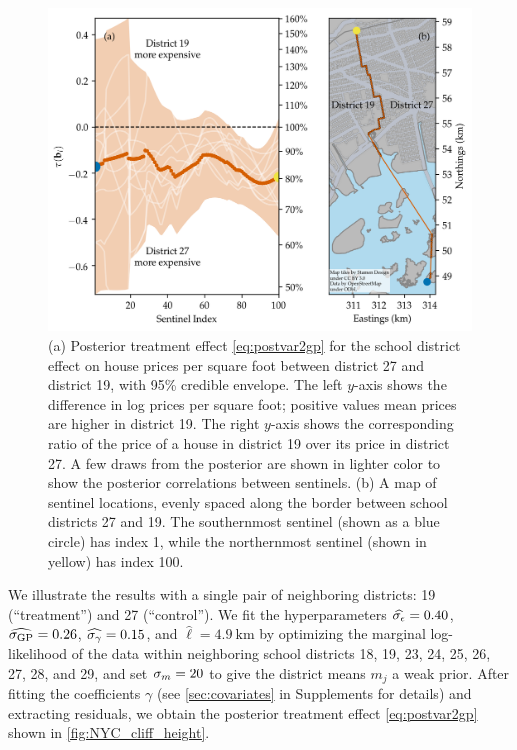 \documentclass{article}
\newcommand{\autorefexternal}[1]{\autoref*{#1}}
\begin{document}
\begin{figure}
  \begin{minipage}[c]{0.5\textwidth}
    \includegraphics[width=\textwidth]{figures/NYC_cliff_face.png}
  \end{minipage}\hfill
  \begin{minipage}[c]{0.5\textwidth}
    \caption{
        (a)
        Posterior treatment effect \autoref{eq:postvar2gp} for the school district effect on house prices per square foot between district 27 and district 19, with 95\% credible envelope.
        The left \(y\)-axis shows the difference in log prices per square foot; positive values mean prices are higher in district 19.
        The right \(y\)-axis shows the corresponding ratio of the price of a house in district 19 over its price in district 27.
        A few draws from the posterior are shown in lighter color to show the posterior correlations between sentinels.
        (b)
        A map of sentinel locations, evenly spaced along the border between school districts 27 and 19.
    	The southernmost sentinel (shown as a blue circle) has index 1, while the northernmost sentinel (shown in yellow) has index 100.\label{fig:NYC_cliff_height}
    } 
  \end{minipage}
\end{figure}

We illustrate the results with a single pair of neighboring districts: 19 (``treatment'') and 27 (``control'').
We fit the hyperparameters \(\widehat{\sigma_{\epsilon}}=0.40\), \(\widehat{\sigma_{\mathrm{GP}}}=0.26\), \(\widehat{\sigma_{\gamma}}=0.15\), and \(\widehat{\ell}=4.9~\text{km}\)
by optimizing the marginal log-likelihood of the data within neighboring school districts 18, 19, 23, 24, 25, 26, 27, 28, and 29,
and set \(\sigma_{m}=20\) to give the district means \(m_j\) a weak prior.
After fitting the coefficients \(\gamma\) (see \autorefexternal{sec:covariates} in Supplements for details) and extracting residuals, we obtain the posterior treatment effect \autoref{eq:postvar2gp} shown in \autoref{fig:NYC_cliff_height}.
\end{document}
